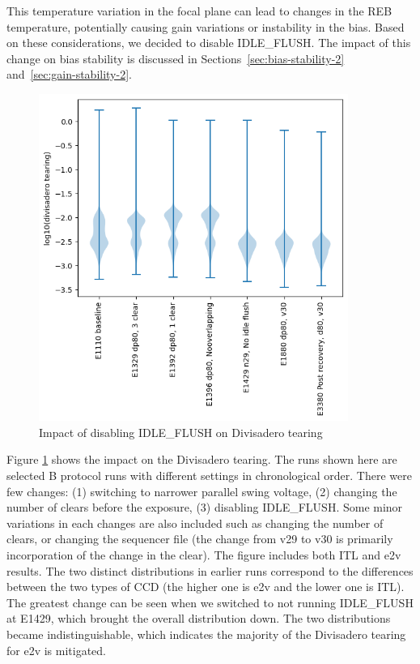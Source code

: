 This temperature variation in the focal plane can lead to changes in the REB temperature, potentially causing gain variations or instability in the bias. Based on these considerations, we decided to disable IDLE\_FLUSH. The impact of this change on bias stability is discussed in Sections~\ref{sec:bias-stability-2} and~\ref{sec:gain-stability-2}.

\begin{figure}[ht]
\begin{centering}
\includegraphics[width=0.9\textwidth]{figures/divisadero.png}
\end{centering}
\caption{Impact of disabling IDLE\_FLUSH on Divisadero tearing}\label{IdleFlushEffect:divisadero}
\end{figure}
Figure \ref{IdleFlushEffect:divisadero} shows the impact on the Divisadero tearing. The runs shown here are selected B protocol runs with different settings in chronological order. There were few changes: (1) switching to narrower parallel swing voltage, (2) changing the number of clears before the exposure, (3) disabling IDLE\_FLUSH.  Some minor variations in each changes are also included such as changing the number of clears, or changing the sequencer file (the change from v29 to v30  is primarily incorporation of the change in the clear). The figure includes both ITL and e2v results. The two distinct distributions in earlier runs correspond to the differences between the two types of CCD (the higher one is e2v and the lower one is ITL). The greatest change can be seen when we switched to not running IDLE\_FLUSH at E1429, which brought the overall distribution down. The two distributions became indistinguishable, which indicates the majority of the Divisadero tearing for e2v is mitigated.

